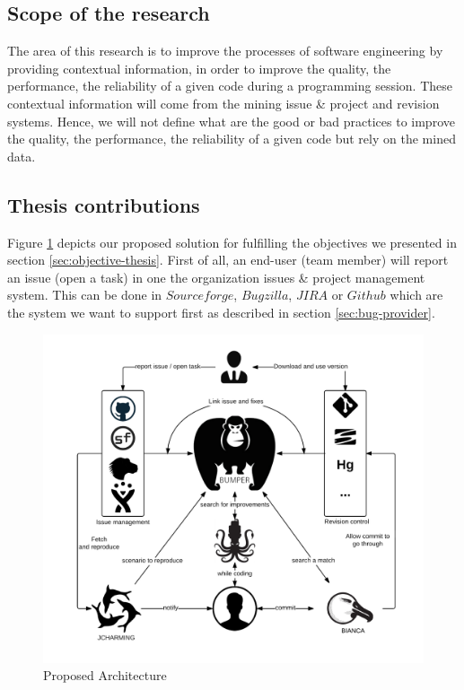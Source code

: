 \subsection{Scope of the research \label{sec:scope}}

The area of this research is to improve the processes of software engineering by providing contextual information, in order to improve the quality, the performance, the reliability of a given code during a programming session. These contextual information will come from the mining issue \& project and revision systems. Hence, we will not define what are the good or bad practices to improve the quality, the performance, the reliability of a given code but rely on the mined data.

\subsection{Thesis contributions\label{sec:objective-thesis}}

Figure \ref{fig:proposal} depicts our proposed solution for fulfilling the objectives we presented in section \ref{sec:objective-thesis}.
First of all, an end-user (team member) will report an issue (open a task) in one the organization issues \& project management system. This can be done in $Sourceforge$, $Bugzilla$, $JIRA$ or $Github$ which are the system we want to support first as described in section \ref{sec:bug-provider}.

\begin{figure}[h!]
	\centering
	\includegraphics[scale=0.9]{media/proposal.png}
	\caption{Proposed Architecture}
	\label{fig:proposal}
\end{figure}


